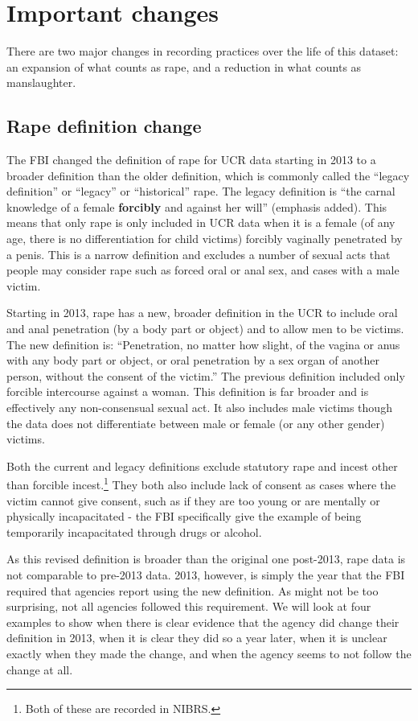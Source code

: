 \documentclass[
]{krantz}
\begin{document}
\section{Important changes}\label{important-changes}

There are two major changes in recording practices over the
life of this dataset: an expansion of what counts as rape,
and a reduction in what counts as manslaughter.

\subsection{Rape definition
change}\label{rape-definition-change}

The FBI changed the definition of rape for UCR data starting
in 2013 to a broader definition than the older definition,
which is commonly called the ``legacy definition'' or
``legacy'' or ``historical'' rape. The legacy definition is
``the carnal knowledge of a female \textbf{forcibly} and
against her will'' (emphasis added). This means that only
rape is only included in UCR data when it is a female (of
any age, there is no differentiation for child victims)
forcibly vaginally penetrated by a penis. This is a narrow
definition and excludes a number of sexual acts that people
may consider rape such as forced oral or anal sex, and cases
with a male victim.

Starting in 2013, rape has a new, broader definition in the
UCR to include oral and anal penetration (by a body part or
object) and to allow men to be victims. The new definition
is: ``Penetration, no matter how slight, of the vagina or
anus with any body part or object, or oral penetration by a
sex organ of another person, without the consent of the
victim.'' The previous definition included only forcible
intercourse against a woman. This definition is far broader
and is effectively any non-consensual sexual act. It also
includes male victims though the data does not differentiate
between male or female (or any other gender) victims.

Both the current and legacy definitions exclude statutory
rape and incest other than forcible incest.\footnote{Both of
  these are recorded in NIBRS.} They both also include lack
of consent as cases where the victim cannot give consent,
such as if they are too young or are mentally or physically
incapacitated - the FBI specifically give the example of
being temporarily incapacitated through drugs or alcohol.

As this revised definition is broader than the original one
post-2013, rape data is not comparable to pre-2013 data.
2013, however, is simply the year that the FBI required that
agencies report using the new definition. As might not be
too surprising, not all agencies followed this requirement.
We will look at four examples to show when there is clear
evidence that the agency did change their definition in
2013, when it is clear they did so a year later, when it is
unclear exactly when they made the change, and when the
agency seems to not follow the change at all.
\end{document}
